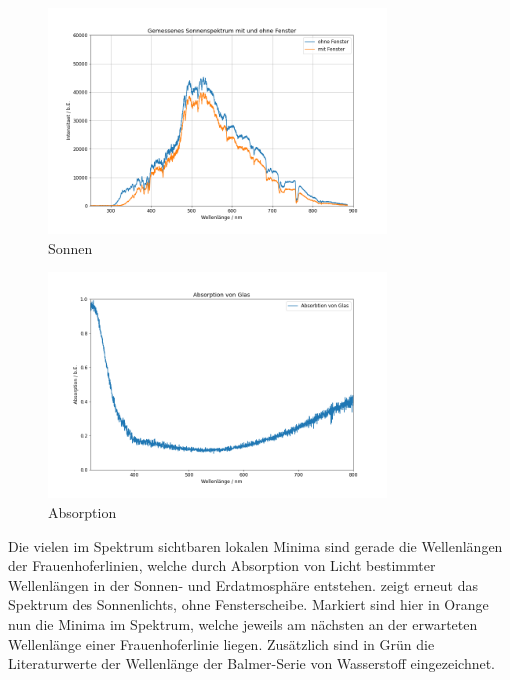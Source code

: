 \begin{figure}[H]
  \centering
  \includegraphics[width=0.8\textwidth]{files/plots/himmel_m_o_g.png}
  \caption{Sonnen}
  \label{fig:himmel_m_o_g}
\end{figure}

\begin{figure}[H]
  \centering
  \includegraphics[width=0.8\textwidth]{files/plots/absorption_glas.png}
  \caption{Absorption}
  \label{fig:absorption_glas}
\end{figure}

Die vielen im Spektrum sichtbaren lokalen Minima sind gerade die Wellenlängen der Frauenhoferlinien, welche durch Absorption von Licht bestimmter Wellenlängen in der Sonnen- und Erdatmosphäre entstehen.  zeigt erneut das Spektrum des Sonnenlichts, ohne Fensterscheibe. Markiert sind hier in Orange nun die Minima im Spektrum, welche jeweils am nächsten an der erwarteten Wellenlänge einer Frauenhoferlinie liegen. Zusätzlich sind in Grün die Literaturwerte der Wellenlänge der Balmer-Serie von Wasserstoff eingezeichnet.


